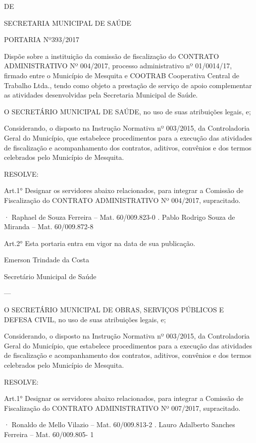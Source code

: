 \documentclass{doliberto}
\begin{document}
DE 

SECRETARIA MUNICIPAL DE SAÚDE 
 
PORTARIA Nº393/2017 
 
Dispõe  sobre  a  instituição  da  comissão  de  fiscalização  do 
CONTRATO  ADMINISTRATIVO  Nº  004/2017,  processo 
administrativo  nº  01/0014/17, 
firmado  entre  o 
Município de Mesquita e COOTRAB Cooperativa Central 
de  Trabalho  Ltda.,  tendo  como  objeto  a  prestação  de 
serviço de apoio complementar as atividades desenvolvidas 
pela Secretaria Municipal de Saúde. 
 
O  SECRETÁRIO  MUNICIPAL  DE  SAÚDE,  no  uso  de  suas 
atribuições legais, e; 
 
Considerando,  o  disposto  na  Instrução  Normativa  nº 
003/2015,  da  Controladoria  Geral  do  Município,  que 
estabelece  procedimentos  para  a  execução  das  atividades 
de  fiscalização  e  acompanhamento  dos  contratos,  aditivos, 
convênios  e  dos  termos  celebrados  pelo  Município  de 
Mesquita. 
 
RESOLVE: 
 
Art.1°  Designar  os  servidores  abaixo  relacionados,  para 
integrar  a  Comissão  de  Fiscalização  do  CONTRATO 
ADMINISTRATIVO Nº 004/2017, supracitado. 
 
· Raphael de Souza Ferreira – Mat. 60/009.823-0 
. Pablo Rodrigo Souza de Miranda – Mat. 60/009.872-8 
 
Art.2°  Esta  portaria  entra  em  vigor  na  data  de  sua 
publicação.  
 

Emerson Trindade da Costa 

Secretário Municipal de Saúde 

---

O  SECRETÁRIO  MUNICIPAL  DE  OBRAS,  SERVIÇOS 
PÚBLICOS  E  DEFESA  CIVIL,  no  uso  de  suas  atribuições 
legais, e; 
 
Considerando,  o  disposto  na  Instrução  Normativa  nº 
003/2015,  da  Controladoria  Geral  do  Município,  que 
estabelece  procedimentos  para  a  execução  das  atividades 
de  fiscalização  e  acompanhamento  dos  contratos,  aditivos, 
convênios  e  dos  termos  celebrados  pelo  Município  de 
Mesquita. 
 
RESOLVE: 
 
Art.1°  Designar  os  servidores  abaixo  relacionados,  para 
integrar  a  Comissão  de  Fiscalização  do  CONTRATO 
ADMINISTRATIVO Nº 007/2017, supracitado. 
 
· Ronaldo de Mello Vilazio – Mat. 60/009.813-2 
. Lauro Adalberto Sanches Ferreira – Mat. 60/009.805-
1 
 
\end{document}
